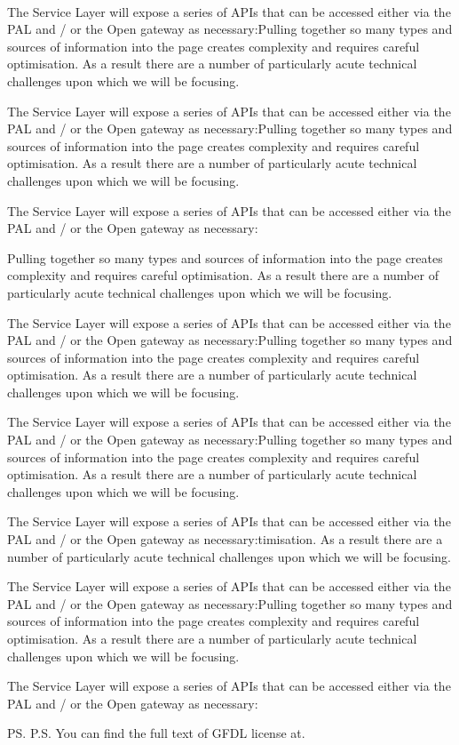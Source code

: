 \documentclass[10pt, paper=A4, parskip=full,asymTypB, subject=afteropening, subject=left,Farrukh
               enlargefirstpage ]{scrlttr2}
\begin{document}
\begin{letter}{%
\tystrrecipient \\
\tystrrecipientaddress
}
The Service Layer will expose a series of APIs that can be accessed either via the PAL and / or the Open gateway as necessary:Pulling together so many types and sources of information into the page creates complexity and requires careful optimisation. As a result there are a number of particularly acute technical challenges upon which we will be focusing.

The Service Layer will expose a series of APIs that can be accessed either via the PAL and / or the Open gateway as necessary:Pulling together so many types and sources of information into the page creates complexity and requires careful optimisation. As a result there are a number of particularly acute technical challenges upon which we will be focusing.

The Service Layer will expose a series of APIs that can be accessed either via the PAL and / or the Open gateway as necessary:

Pulling together so many types and sources of information into the page creates complexity and requires careful optimisation. As a result there are a number of particularly acute technical challenges upon which we will be focusing.

The Service Layer will expose a series of APIs that can be accessed either via the PAL and / or the Open gateway as necessary:Pulling together so many types and sources of information into the page creates complexity and requires careful optimisation. As a result there are a number of particularly acute technical challenges upon which we will be focusing.

The Service Layer will expose a series of APIs that can be accessed either via the PAL and / or the Open gateway as necessary:Pulling together so many types and sources of information into the page creates complexity and requires careful optimisation. As a result there are a number of particularly acute technical challenges upon which we will be focusing.

The Service Layer will expose a series of APIs that can be accessed either via the PAL and / or the Open gateway as necessary:timisation. As a result there are a number of particularly acute technical challenges upon which we will be focusing.

The Service Layer will expose a series of APIs that can be accessed either via the PAL and / or the Open gateway as necessary:Pulling together so many types and sources of information into the page creates complexity and requires careful optimisation. As a result there are a number of particularly acute technical challenges upon which we will be focusing.

The Service Layer will expose a series of APIs that can be accessed either via the PAL and / or the Open gateway as necessary:

\closing{\tystrclosing}
\ps{P.S. You can find the full text of GFDL license at.}
\end{letter}
\end{document}

